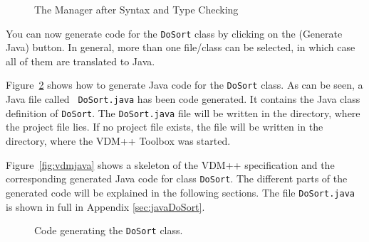 \documentclass[\pformat,11pt]{article}
\newcommand{\guicmd}[1]{{\sf #1}}
\begin{document}
\begin{figure}[H]
\begin{center}
\mbox{}
\caption{The Manager after Syntax and Type Checking}\label{fig:toolbox}
\end{center}
\end{figure}

You can now generate code for the {\tt DoSort} class by clicking on
the 
(\guicmd{Generate Java}) button. In general, more than one file/class
can be selected, in which case all of them are translated to Java.

Figure~\ref{fig:interpreter} shows how to generate Java code for the
{\tt DoSort} class.  As can be seen, a Java file called {\tt
  DoSort.java} has been code generated.  It contains the Java class
definition of {\tt DoSort}.  The {\tt DoSort.java} file will be written in the
directory, where the project file lies. If no project file exists, the
file will be written in the directory, where the VDM++ Toolbox was
started.

Figure~\ref{fig:vdmjava} shows a skeleton of the VDM++ specification
and the corresponding generated Java code for class {\tt DoSort}.  The
different parts of the generated code will be explained in the
following sections. The file {\tt DoSort.java} is shown in full in
Appendix \ref{sec:javaDoSort}. 

\begin{figure}[H]
\begin{center}
\mbox{}
\caption{Code generating the {\tt DoSort} class.}\label{fig:interpreter}
\end{center}
\end{figure}
\end{document}
